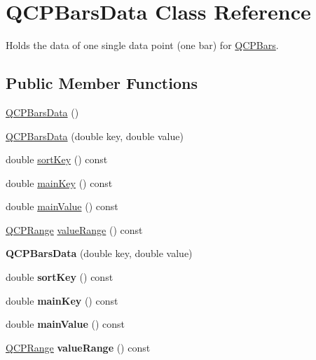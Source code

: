 \hypertarget{class_q_c_p_bars_data}{}\section{Q\+C\+P\+Bars\+Data Class Reference}
\label{class_q_c_p_bars_data}


Holds the data of one single data point (one bar) for \hyperlink{class_q_c_p_bars}{Q\+C\+P\+Bars}.  


\subsection*{Public Member Functions}
\begin{DoxyCompactItemize}
\item 
\hyperlink{class_q_c_p_bars_data_a800794d4c5fea22eeb8bade20798496b}{Q\+C\+P\+Bars\+Data} ()
\item 
\hyperlink{class_q_c_p_bars_data_a4158816a69e2c675885f48afa2b5acc9}{Q\+C\+P\+Bars\+Data} (double key, double value)
\item 
double \hyperlink{class_q_c_p_bars_data_aec71a3f55d0d52192ff9ad85b04ebf8d}{sort\+Key} () const 
\item 
double \hyperlink{class_q_c_p_bars_data_a8d9c33934d75e11d6e205981a4e4b11d}{main\+Key} () const 
\item 
double \hyperlink{class_q_c_p_bars_data_a0ee3c777e5df7d5f5f63fe82539845d5}{main\+Value} () const 
\item 
\hyperlink{class_q_c_p_range}{Q\+C\+P\+Range} \hyperlink{class_q_c_p_bars_data_a87e9dc820e4b306da4dbec1a993bec14}{value\+Range} () const 
\item 
{\bfseries Q\+C\+P\+Bars\+Data} (double key, double value)\hypertarget{class_q_c_p_bars_data_a4158816a69e2c675885f48afa2b5acc9}{}\label{class_q_c_p_bars_data_a4158816a69e2c675885f48afa2b5acc9}

\item 
double {\bfseries sort\+Key} () const \hypertarget{class_q_c_p_bars_data_aec71a3f55d0d52192ff9ad85b04ebf8d}{}\label{class_q_c_p_bars_data_aec71a3f55d0d52192ff9ad85b04ebf8d}

\item 
double {\bfseries main\+Key} () const \hypertarget{class_q_c_p_bars_data_a8d9c33934d75e11d6e205981a4e4b11d}{}\label{class_q_c_p_bars_data_a8d9c33934d75e11d6e205981a4e4b11d}

\item 
double {\bfseries main\+Value} () const \hypertarget{class_q_c_p_bars_data_a0ee3c777e5df7d5f5f63fe82539845d5}{}\label{class_q_c_p_bars_data_a0ee3c777e5df7d5f5f63fe82539845d5}

\item 
\hyperlink{class_q_c_p_range}{Q\+C\+P\+Range} {\bfseries value\+Range} () const \hypertarget{class_q_c_p_bars_data_a87e9dc820e4b306da4dbec1a993bec14}{}\label{class_q_c_p_bars_data_a87e9dc820e4b306da4dbec1a993bec14}

\end{DoxyCompactItemize}
